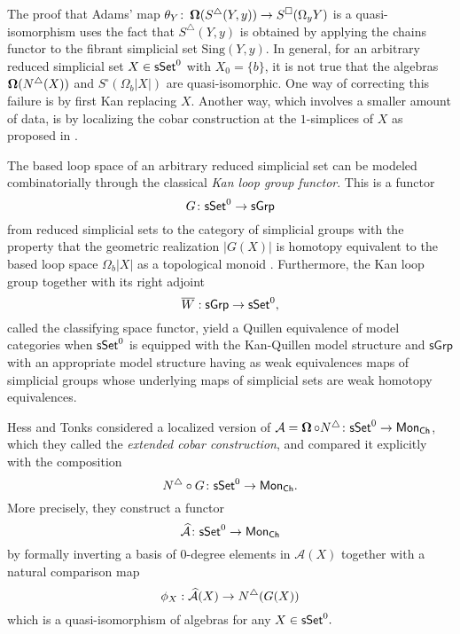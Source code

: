 The proof that Adams’ map $\theta_Y \colon \operatorname{\mathbf{\Omega}}(S^\triangle(Y, y)) \to S^{\square}(\Omega_y Y)$ is a quasi-isomorphism uses the fact that $S^\triangle(Y, y)$ is obtained by applying the chains functor to the fibrant simplicial set $\text{Sing}(Y,y)$.
In general, for an arbitrary reduced simplicial set $X \in \mathsf{sSet}^0$ with $X_0=\{b\}$, it is not true that the algebras
$\operatorname{\mathbf{\Omega}}(N^{\triangle}(X))$ and $S^{\square}(\Omega_b |X|)$ are quasi-isomorphic.
One way of correcting this failure is by first Kan replacing $X$.
Another way, which involves a smaller amount of data, is by localizing the cobar construction at the $1$-simplices of $X$ as proposed in \cite{hess2010cobar}.

The based loop space of an arbitrary reduced simplicial set can be modeled combinatorially through the classical \textit{Kan loop group functor}.
This is a functor 
$$G\colon \mathsf{sSet}^0 \to \mathsf{sGrp}$$
from reduced simplicial sets to the category of simplicial groups with the property that the geometric realization $|G(X)|$ is homotopy equivalent to the based loop space $\Omega_b|X|$ as a topological monoid \cite{berger1995loops}. Furthermore, the Kan loop group together with its right adjoint $$\overline{W}: \mathsf{sGrp} \to \mathsf{sSet}^0,$$ called the classifying space functor, yield a Quillen equivalence of model categories when $\mathsf{sSet}^0$ is equipped with the Kan-Quillen model structure and $\mathsf{sGrp}$ with an appropriate model structure having as weak equivalences maps of simplicial groups whose underlying maps of simplicial sets are weak homotopy equivalences. 

Hess and Tonks considered a localized version of $\mathcal{A} = \operatorname{\mathbf{\Omega}} \circ N^{\triangle} \colon \mathsf{sSet}^0 \to \mathsf{Mon}_{\mathsf{Ch}}$, which they called the \textit{extended cobar construction}, and compared it explicitly with the composition $$N^{\triangle} \circ G \colon \mathsf{sSet}^0 \to \mathsf{Mon}_{\mathsf{Ch}}.$$ More precisely, they construct a functor
$$\widehat{\mathcal{A}} \colon \mathsf{sSet}^0 \to \mathsf{Mon}_{\mathsf{Ch}}$$
by formally inverting a basis of $0$-degree elements in $\mathcal{A}(X)$ together with a natural comparison map
$$\phi_X: \widehat{\mathcal{A}}(X) \to N^{\triangle}(G(X))$$
which is a quasi-isomorphism of algebras for any $X \in \mathsf{sSet}^0.$

